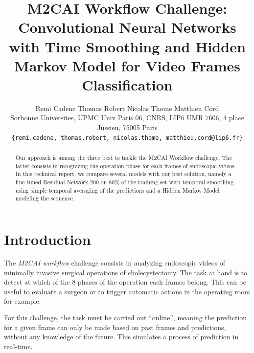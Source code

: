\documentclass[10pt,twocolumn,letterpaper]{article}
\begin{document}
\title{M2CAI Workflow Challenge: Convolutional Neural Networks with Time Smoothing and Hidden Markov Model for Video Frames Classification}

\author{Remi Cadene \hspace{1cm} Thomas Robert \hspace{1cm} Nicolas Thome \hspace{1cm} Matthieu Cord\\
Sorbonne Universites, UPMC Univ Paris 06, CNRS, LIP6 UMR 7606, 4 place Jussieu, 75005 Paris\\
{\tt\small \{remi.cadene, thomas.robert, nicolas.thome, matthieu.cord@lip6.fr\}}
}

\maketitle

\begin{abstract}
Our approach is among the three best to tackle the M2CAI Workflow challenge. The latter consists in recognizing the operation phase for each frames of endoscopic videos. In this technical report, we compare several models with our best solution, namely a fine tuned Residual Network-200 on 80\% of the training set with temporal smoothing using simple temporal averaging of the predictions and a Hidden Markov Model modeling the sequence.
\end{abstract}

\section{Introduction}

The \emph{M2CAI workflow} challenge consists in analyzing endoscopic videos of
minimally invasive surgical operations of cholecystectomy. The task at hand is
to detect at which of the 8 phases of the operation each frames belong. This can
be useful to evaluate a surgeon or to trigger automatic actions in the operating
room for example.

For this challenge, the task must be carried out ``online'', meaning the prediction
for a given frame can only be made based on past frames and predictions, without
any knowledge of the future. This simulates a process of prediction in real-time.
\end{document}

